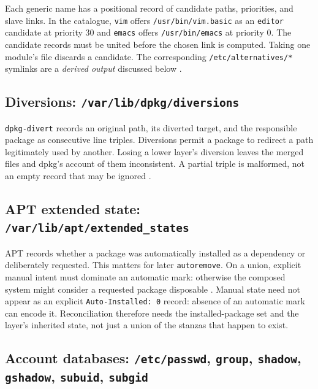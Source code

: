 Each generic name has a positional record of candidate paths, priorities, and slave links. In the catalogue, \texttt{vim} offers \texttt{/usr/bin/vim.basic} as an \texttt{editor} candidate at priority \num{30} and \texttt{emacs} offers \texttt{/usr/bin/emacs} at priority \num{0}. The candidate records must be united before the chosen link is computed. Taking one module's file discards a candidate. The corresponding \texttt{/etc/alternatives/*} symlinks are a \emph{derived output} discussed below \autocite{man-update-alternatives,debian-policy-alternatives}.

\subsection{Diversions: \texttt{/var/lib/dpkg/diversions}}

\texttt{dpkg-divert} records an original path, its diverted target, and the responsible package as consecutive line triples. Diversions permit a package to redirect a path legitimately used by another. Losing a lower layer's diversion leaves the merged files and dpkg's account of them inconsistent. A partial triple is malformed, not an empty record that may be ignored \autocite{man-dpkg-divert}.

\subsection{\ac{APT} extended state: \texttt{/var/lib/apt/extended\_states}}

\ac{APT} records whether a package was automatically installed as a dependency or deliberately requested. This matters for later \texttt{autoremove}. On a union, explicit manual intent must dominate an automatic mark: otherwise the composed system might consider a requested package disposable \autocite{man-apt-mark}. Manual state need not appear as an explicit \texttt{Auto-Installed: 0} record: absence of an automatic mark can encode it. Reconciliation therefore needs the installed-package set and the layer's inherited state, not just a union of the stanzas that happen to exist.

\subsection{Account databases: \texttt{/etc/passwd}, \texttt{group}, \texttt{shadow}, \texttt{gshadow}, \texttt{subuid}, \texttt{subgid}}

